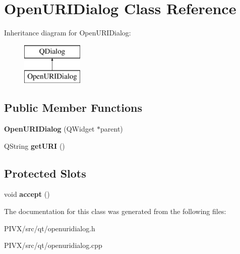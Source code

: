 \hypertarget{class_open_u_r_i_dialog}{}\section{Open\+U\+R\+I\+Dialog Class Reference}
\label{class_open_u_r_i_dialog}
Inheritance diagram for Open\+U\+R\+I\+Dialog\+:\begin{figure}[H]
\begin{center}
\leavevmode
\includegraphics[height=2.000000cm]{class_open_u_r_i_dialog}
\end{center}
\end{figure}
\subsection*{Public Member Functions}
\begin{DoxyCompactItemize}
\item 
\mbox{\label{class_open_u_r_i_dialog_aa8b99129a4e66c994474c4a5056cd172}} 
{\bfseries Open\+U\+R\+I\+Dialog} (Q\+Widget $\ast$parent)
\item 
\mbox{\label{class_open_u_r_i_dialog_a38f9f110ae47996eff920171aea9400b}} 
Q\+String {\bfseries get\+U\+RI} ()
\end{DoxyCompactItemize}
\subsection*{Protected Slots}
\begin{DoxyCompactItemize}
\item 
\mbox{\label{class_open_u_r_i_dialog_a3c0c5b376623e9570cc17e23778c239c}} 
void {\bfseries accept} ()
\end{DoxyCompactItemize}


The documentation for this class was generated from the following files\+:\begin{DoxyCompactItemize}
\item 
P\+I\+V\+X/src/qt/openuridialog.\+h\item 
P\+I\+V\+X/src/qt/openuridialog.\+cpp\end{DoxyCompactItemize}
